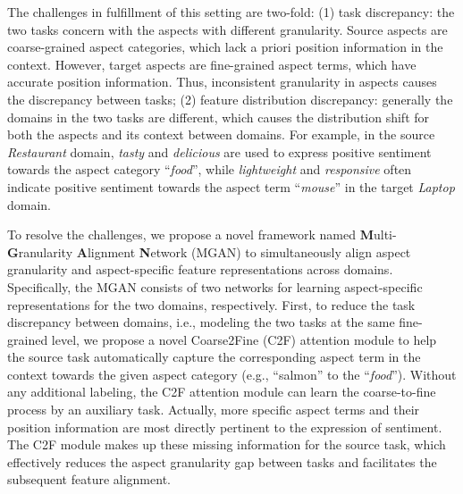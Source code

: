\documentclass[letterpaper]{article} \usepackage{aaai19}  \usepackage{times}  \usepackage{latexsym}
\begin{document}
The challenges in fulfillment of this setting are two-fold: (1) task discrepancy: the two tasks concern with the aspects with different granularity. Source aspects are coarse-grained aspect categories, which lack a priori position information in the context. However, target aspects are fine-grained aspect terms, which have accurate position information. Thus, inconsistent granularity in aspects causes the discrepancy between tasks; (2) feature distribution discrepancy: generally the domains in the two tasks are different, which causes the distribution shift for both the aspects and its context between domains. For example, in the source {\it Restaurant} domain, {\it tasty} and {\it delicious} are used to express positive sentiment towards the aspect category ``{\it food}'', while {\it lightweight} and {\it responsive} often indicate positive sentiment towards the aspect term ``{\it mouse}'' in the target {\it Laptop} domain. 















To resolve the challenges, we propose a novel framework named \textbf{M}ulti-\textbf{G}ranularity \textbf{A}lignment \textbf{N}etwork (MGAN) to simultaneously align aspect granularity and aspect-specific feature representations across domains. Specifically, the MGAN consists of two networks for learning aspect-specific representations for the two domains, respectively. First, to reduce the task discrepancy between domains, i.e., modeling the two tasks at the same fine-grained level, we propose a novel Coarse2Fine (C2F) attention module to help the source task automatically capture the corresponding aspect term in the context towards the given aspect category (e.g., ``salmon'' to the ``{\it food}''). Without any additional labeling, the C2F attention module can learn the coarse-to-fine process by an auxiliary task. Actually, more specific aspect terms and their position information are most directly pertinent to the expression of sentiment. The C2F module makes up these missing information for the source task, which effectively reduces the aspect granularity gap between tasks and facilitates the subsequent feature alignment. 
\end{document}

